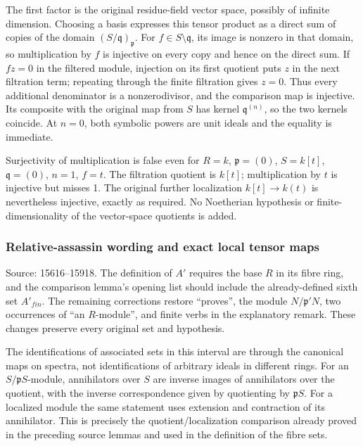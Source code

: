 The first factor is the original residue-field vector space, possibly of infinite dimension. Choosing a basis expresses this tensor product as a direct sum of copies of the domain \((S/\mathfrak q)_{\mathfrak p}\). For \(f\in S\setminus\mathfrak q\), its image is nonzero in that domain, so multiplication by \(f\) is injective on every copy and hence on the direct sum. If \(fz=0\) in the filtered module, injection on its first quotient puts \(z\) in the next filtration term; repeating through the finite filtration gives \(z=0\). Thus every additional denominator is a nonzerodivisor, and the comparison map is injective. Its composite with the original map from \(S\) has kernel \(\mathfrak q^{(n)}\), so the two kernels coincide. At \(n=0\), both symbolic powers are unit ideals and the equality is immediate.

Surjectivity of multiplication is false even for \(R=k\), \(\mathfrak p=(0)\), \(S=k[t]\), \(\mathfrak q=(0)\), \(n=1\), \(f=t\). The filtration quotient is \(k[t]\); multiplication by \(t\) is injective but misses 1. The original further localization \(k[t]\to k(t)\) is nevertheless injective, exactly as required. No Noetherian hypothesis or finite-dimensionality of the vector-space quotients is added.

\subsubsection{Relative-assassin wording and exact local tensor maps}\label{relative-assassin-wording-and-exact-local-tensor-maps}

Source: 15616--15918. The definition of \(A'\) requires the base \(R\) in its fibre ring, and the comparison lemma's opening list should include the already-defined sixth set \(A'_{fin}\). The remaining corrections restore ``proves'', the module \(N/\mathfrak p'N\), two occurrences of ``an \(R\)-module'', and finite verbs in the explanatory remark. These changes preserve every original set and hypothesis.

The identifications of associated sets in this interval are through the canonical maps on spectra, not identifications of arbitrary ideals in different rings. For an \(S/\mathfrak pS\)-module, annihilators over \(S\) are inverse images of annihilators over the quotient, with the inverse correspondence given by quotienting by \(\mathfrak pS\). For a localized module the same statement uses extension and contraction of its annihilator. This is precisely the quotient/localization comparison already proved in the preceding source lemmas and used in the definition of the fibre sets.

